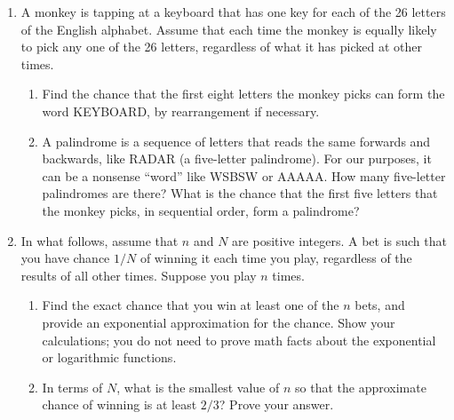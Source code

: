 \documentclass[11pt]{article}
\begin{document}
\begin{enumerate}
    \item A monkey is tapping at a keyboard that has one key for each of the 26 letters of the English alphabet. Assume that
each time the monkey is equally likely to pick any one of the 26 letters, regardless of what it has picked at other times.
        \begin{enumerate}
            \item Find the chance that the first eight letters the monkey picks can form the word KEYBOARD, by rearrangement 
        if necessary.
            \item A palindrome is a sequence of letters that reads the same forwards and backwards, like RADAR (a five-letter palindrome). 
        For our purposes, it can be a nonsense ``word'' like WSBSW or AAAAA.
        How many five-letter palindromes are there? What is the chance that the first five letters that the monkey picks, in sequential order, form
        a palindrome?
        \end{enumerate}

    \item In what follows, assume that $n$ and $N$ are positive integers. A bet is such that you have chance $1/N$ of winning it each time you play, regardless of the results of all other times. 
Suppose you play $n$ times. 

        \begin{enumerate}
            \item Find the exact chance that you win at least one of the $n$ bets, and provide an exponential approximation for the chance. Show your calculations; you do not need to prove math facts about the exponential or logarithmic functions.

            \item In terms of $N$, what is the smallest value of $n$ so that the approximate chance of winning is at least $2/3$? Prove your answer.
        \end{enumerate}


\end{enumerate}
\end{document}

